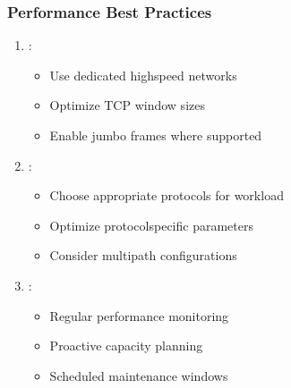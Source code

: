 \documentclass[letterpaper,10pt,english]{sphinxmanual}
\begin{document}
\subsubsection{Performance Best Practices}
\label{\detokenize{network-storage:performance-best-practices}}\begin{enumerate}
%
\item {} 
\sphinxAtStartPar
{}:
\begin{itemize}
\item {} 
\sphinxAtStartPar
Use dedicated high\sphinxhyphen{}speed networks

\item {} 
\sphinxAtStartPar
Optimize TCP window sizes

\item {} 
\sphinxAtStartPar
Enable jumbo frames where supported

\end{itemize}

\item {} 
\sphinxAtStartPar
{}:
\begin{itemize}
\item {} 
\sphinxAtStartPar
Choose appropriate protocols for workload

\item {} 
\sphinxAtStartPar
Optimize protocol\sphinxhyphen{}specific parameters

\item {} 
\sphinxAtStartPar
Consider multi\sphinxhyphen{}path configurations

\end{itemize}

\item {} 
\sphinxAtStartPar
{}:
\begin{itemize}
\item {} 
\sphinxAtStartPar
Regular performance monitoring

\item {} 
\sphinxAtStartPar
Proactive capacity planning

\item {} 
\sphinxAtStartPar
Scheduled maintenance windows

\end{itemize}

\end{enumerate}

\sphinxstepscope
\end{document}
